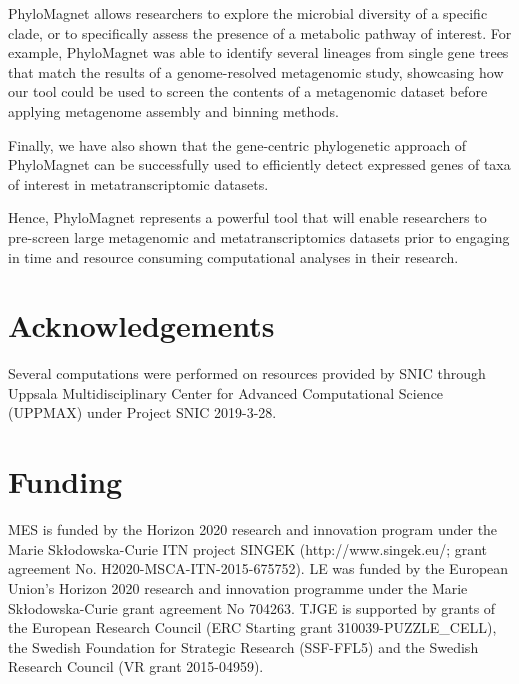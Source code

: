 \documentclass[a4paper]{article}
\begin{document}
PhyloMagnet allows researchers to explore the microbial diversity of a specific clade, or to specifically assess the presence of a metabolic pathway of interest. For example, PhyloMagnet was able to identify several lineages from single gene trees that match the results of a genome-resolved metagenomic study, showcasing how our tool could be used to screen the contents of a metagenomic dataset before applying metagenome assembly and binning methods.

Finally, we have also shown that the gene-centric phylogenetic approach of PhyloMagnet can be successfully used to efficiently detect expressed genes of taxa of interest in metatranscriptomic datasets. 

Hence, PhyloMagnet represents a powerful tool that will enable researchers to pre-screen large metagenomic and metatranscriptomics datasets prior to engaging in time and resource consuming computational analyses in their research.


\section*{Acknowledgements}
Several computations were performed on resources provided by SNIC through Uppsala Multidisciplinary Center for Advanced Computational Science (UPPMAX) under Project SNIC 2019-3-28.

\section*{Funding}
MES is funded by the Horizon 2020 research and innovation program under the Marie Sk\l{}odowska-Curie ITN project SINGEK (http://www.singek.eu/; grant agreement No. H2020-MSCA-ITN-2015-675752). LE was funded by the European Union’s Horizon 2020 research and innovation programme under the Marie Sk\l{}odowska-Curie grant agreement No 704263. TJGE is supported by grants of the European Research Council (ERC Starting grant 310039-PUZZLE\_CELL), the Swedish Foundation for Strategic Research (SSF-FFL5) and the Swedish Research Council (VR grant 2015-04959).

%




\renewcommand\thefigure{S\arabic{figure}}
\setcounter{figure}{0}    

\begin{figure}[!t]
    \resizebox{!}{0cm}{
    \begin{minipage}{\textwidth}
    \caption{}\label{fig:S1}
     \end{minipage}}
\end{figure}
\end{document}
